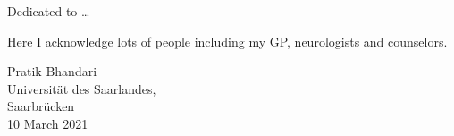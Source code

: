 \documentclass[a4paper, nobind]{templates/ociamthesis}
\begin{document}
\begin{romanpages}

\maketitle

\begin{dedication}
  Dedicated to \ldots{}
\end{dedication}

\begin{acknowledgements}
 	Here I acknowledge lots of people including my GP, neurologists and counselors.

  \begin{flushright}
  Pratik Bhandari \\
  Universität des Saarlandes,\\
  Saarbrücken \\
  10 March 2021
  \end{flushright}
\end{acknowledgements}



\end{romanpages}
\end{document}
